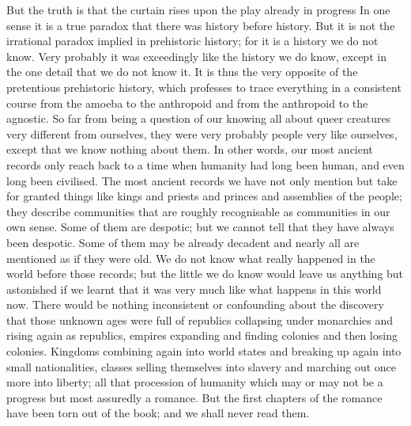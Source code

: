 But the truth is that the curtain rises upon the play already in progress In one sense it is a true paradox that there was history before history. But it is not the irrational paradox implied in prehistoric history; for it is a history we do not know. Very probably it was exceedingly like the history we do know, except in the one detail that we do not know it. It is thus the very opposite of the pretentious prehistoric history, which professes to trace everything in a consistent course from the amoeba to the anthropoid and from the anthropoid to the agnostic. So far from being a question of our knowing all about queer creatures very different from ourselves, they were very probably people very like ourselves, except that we know nothing about them. In other words, our most ancient records only reach back to a time when humanity had long been human, and even long been civilised. The most ancient records we have not only mention but take for granted things like kings and priests and princes and assemblies of the people; they describe communities that are roughly recognisable as communities in our own sense. Some of them are despotic; but we cannot tell that they have always been despotic. Some of them may be already decadent and nearly all are mentioned as if they were old. We do not know what really happened in the world before those records; but the little we do know would leave us anything but astonished if we learnt that it was very much like what happens in this world now. There would be nothing inconsistent or confounding about the discovery that those unknown ages were full of republics collapsing under monarchies and rising again as republics, empires expanding and finding colonies and then losing colonies. Kingdoms combining again into world states and breaking up again into small nationalities, classes selling themselves into slavery and marching out once more into liberty; all that procession of humanity which may or may not be a progress but most assuredly a romance. But the first chapters of the romance have been torn out of the book; and we shall never read them.

